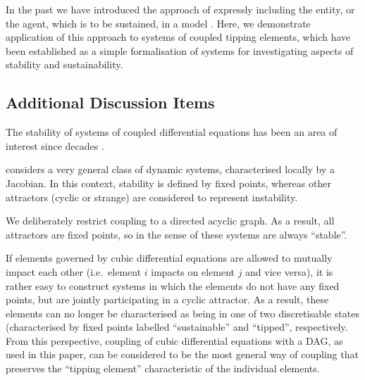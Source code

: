 \documentclass[conference]{IEEEtran}
\begin{document}
In the past we have introduced the approach of expressly including the
entity, or the agent, which is to be sustained, in a model
\cite{Kim2009_sustainability}. Here, we demonstrate application of
this approach to systems of coupled tipping elements, which have been
established as a simple formalisation of systems for investigating
aspects of stability and sustainability.


\subsection{Additional Discussion Items}

The stability of systems of coupled differential equations has been an
area of interest since decades
\cite{May1972_stablelargecomplexsystem,Landi2018_ecologicalnetworks}.

\cite{May1972_stablelargecomplexsystem} considers a very general
class of dynamic systems, characterised locally by a Jacobian. In this
context, stability is defined by fixed points, whereas other
attractors (cyclic or strange) are considered to represent
instability.

We deliberately restrict coupling to a directed acyclic graph. As a
result, all attractors are fixed points, so in the sense of
\cite{May1972_stablelargecomplexsystem} these systems are always
``stable''.

If elements governed by cubic differential equations are allowed to
mutually impact each other (i.e.\ element $i$ impacts on element $j$
and vice versa), it is rather easy to construct systems in which the
elements do not have any fixed points, but are jointly participating
in a cyclic attractor. As a result, these elements can no longer be
characterised as being in one of two discretisable states
(characterised by fixed points labelled ``sustainable'' and
``tipped'', respectively. From this perspective, coupling of cubic
differential equations with a DAG, as used in this paper, can be
considered to be the most general way of coupling that preserves the
``tipping element'' characteristic of the individual elements.




\end{document}
